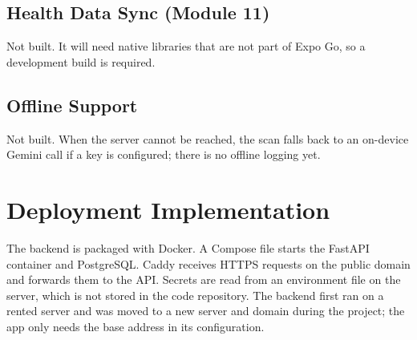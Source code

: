 \subsection{Health Data Sync (Module 11)}
Not built. It will need native libraries that are not part of Expo Go, so a development build is required.

\subsection{Offline Support}
Not built. When the server cannot be reached, the scan falls back to an on-device Gemini call if a key is
configured; there is no offline logging yet.

\section{Deployment Implementation}
The backend is packaged with Docker. A Compose file starts the FastAPI container and PostgreSQL. Caddy receives
HTTPS requests on the public domain and forwards them to the API. Secrets are read from an environment file on the
server, which is not stored in the code repository. The backend first ran on a rented server and was moved to a new
server and domain during the project; the app only needs the base address in its configuration.

